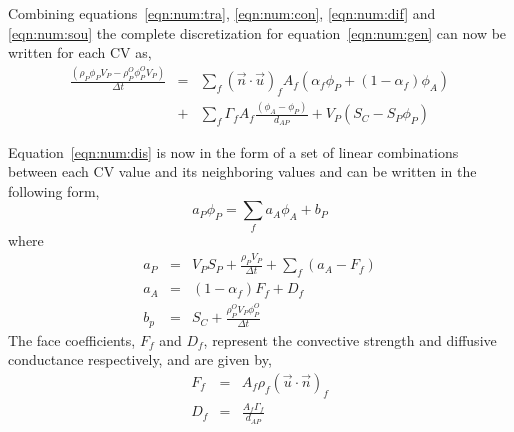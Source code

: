 Combining equations~\eqref{eqn:num:tra}, \eqref{eqn:num:con},
\eqref{eqn:num:dif} and \eqref{eqn:num:sou} the complete
discretization for equation~\eqref{eqn:num:gen} can now be written for
each CV as,
\begin{eqnarray}
\frac{(\rho_{P} \phi_{P} V_P- \rho_P^O \phi_P^O V_P)}{\Delta t}
&=&
\sum_{f} (\vec{n} \cdot \vec{u})_f A_f (\alpha_f \phi_P +(1-\alpha_f)\phi_A)
\\
&+&
\sum_f \Gamma_f A_f \frac{(\phi_A-\phi_P)}{d_{AP}}
+ 
V_P ( S_C - S_P \phi_P )
\label{eqn:num:dis}
\end{eqnarray}

Equation~\eqref{eqn:num:dis} is now in the form of a set of linear
combinations between each CV value and its neighboring values and can be
written in the following form,
\begin{equation}
a_P \phi_P = \sum_f a_{A} \phi_{A} + b_P
\label{eqn:num:dap}
\end{equation}
where
\begin{eqnarray}
a_P & = & V_P S_P + \frac{\rho_P V_P}{\Delta t} + \sum_f (a_{A} - F_f) \\
a_{A} & = & ( 1 - \alpha_f ) F_f + D_f \\
b_p & = & S_C + \frac{\rho_P^O V_P \phi_P^O}{\Delta t} 
\end{eqnarray}
The face coefficients, $F_f$ and $D_f$, represent the convective strength
and diffusive conductance respectively, and are given by,
\begin{eqnarray}
F_f & = & A_f \rho_f ( \vec{u} \cdot \vec{n} )_f \\
D_f & = & \frac{A_f \Gamma_f}{d_{AP}} 
\end{eqnarray}












